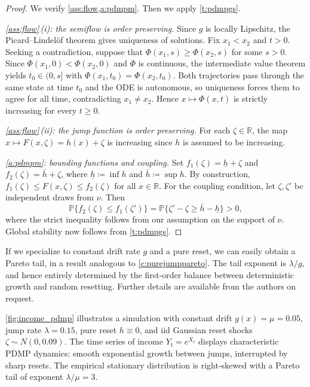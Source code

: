 \documentclass[12pt,reqno]{amsart}
\numberwithin{equation}{section}
\theoremstyle{definition}
\newcommand{\1}{\mathbbm{1}}
\newcommand{\RR}{\mathbb{R}}
\newcommand{\PP}{\mathbb P}
\newcommand{\lam}{\lambda}
\begin{document}
\begin{proof}
    We verify \cref{ass:flow,a:pdmpm}. Then we apply \cref{t:pdmpgs}.

    \textit{\cref{ass:flow}\,(i): the semiflow is order preserving.}  Since $g$
    is locally Lipschitz, the Picard--Lindel\"of theorem gives uniqueness of
    solutions.  Fix $x_1 < x_2$ and $t > 0$.  Seeking a contradiction, suppose 
    that $\Phi(x_1, s) \geq \Phi(x_2, s)$ for some $s > 0$.  Since
    $\Phi(x_1, 0) < \Phi(x_2, 0)$ and $\Phi$ is continuous, the intermediate
    value theorem yields $t_0 \in (0, s]$ with $\Phi(x_1, t_0) = \Phi(x_2,
    t_0)$.  Both trajectories pass through the same state at time $t_0$ and the
    ODE is autonomous, so uniqueness forces them to agree for all time,
    contradicting $x_1 \neq x_2$.  Hence $x \mapsto \Phi(x, t)$ is strictly
    increasing for every $t \geq 0$.

    \textit{\cref{ass:flow}\,(ii): the jump function is order preserving.}  For
    each $\zeta \in \RR$, the map $x \mapsto F(x, \zeta) = h(x) + \zeta$ is
    increasing since $h$ is assumed to be increasing.

    \textit{\cref{a:pdmpm}: bounding functions and coupling.}  Set $f_1(\zeta)
    = \underline{h} + \zeta$ and $f_2(\zeta) = \bar{h} + \zeta$, where
    $\underline{h} \coloneq \inf h$ and $\bar{h} \coloneq \sup h$.  By
    construction, $f_1(\zeta) \leq F(x, \zeta) \leq f_2(\zeta)$ for
    all $x \in \RR$.  For the coupling condition, let $\zeta, \zeta'$ be
    independent draws from $\nu$.  Then
    \begin{equation*}
        \PP\{f_2(\zeta) \leq f_1(\zeta')\}
        = \PP\{\zeta' - \zeta \geq \bar{h} - \underline{h}\}
        > 0,
    \end{equation*}
    where the strict inequality follows from our assumption on the support of
    $\nu$.  Global stability now follows from \cref{t:pdmpgs}.
\end{proof}

If we specialize to constant drift rate $g$ and a pure reset, we can easily obtain a
Pareto tail, in a result analogous to \cref{c:purejumppareto}. The tail exponent
is $\lam/g$, and hence entirely determined by the first-order balance between
deterministic growth and random resetting.  Further details are available from
the authors on request.

\cref{fig:income_pdmp} illustrates a simulation with constant drift $g(x) =
\mu = 0.05$, jump rate $\lam = 0.15$, pure reset $h \equiv 0$, and {\sc iid}
Gaussian reset shocks $\zeta \sim N(0, 0.09)$. The time series of income $Y_t
= e^{X_t}$ displays characteristic PDMP dynamics: smooth exponential growth
between jumps, interrupted by sharp resets. The empirical stationary
distribution is right-skewed with a Pareto tail of exponent $\lam/\mu
= 3$.
\end{document}
